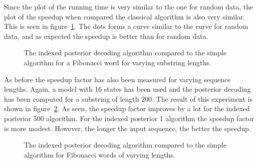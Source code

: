 Since the plot of the running time is very similar to the one for random data,
the plot of the speedup when compared the classical algorithm is also very
similar. This is seen in
figure~\ref{fig:fib_indexed_posterior_speedup_vs_subseq}. The dots forms a
curve similar to the curve for random data, and as expected the speedup is
better than for random data.

\begin{figure}
  \centering
  
  \caption{The indexed posterior decoding algorithm compared to the simple
    algorithm for a Fibonacci word for varying substring lengths.}
  \label{fig:fib_indexed_posterior_speedup_vs_subseq}
\end{figure}

As before the speedup factor has also been measured for varying sequence
lengths. Again, a model with 16 states has been used and the posterior decoding
has been computed for a substring of length 200. The result of this experiment
is shown in figure~\ref{fig:indexed_posterior_fib_speedup_vs_T}. As seen, the
speedup factor improves by a lot for the indexed posterior 500 algorithm. For
the indexed posterior 1 algorithm the speedup factor is more modest. However,
the longer the input sequence, the better the speedup.

\begin{figure}
  \centering
  
  \caption{The indexed posterior decoding algorithm compared to the simple
    algorithm for Fibonacci words of varying lengths.}
  \label{fig:indexed_posterior_fib_speedup_vs_T}
\end{figure}

